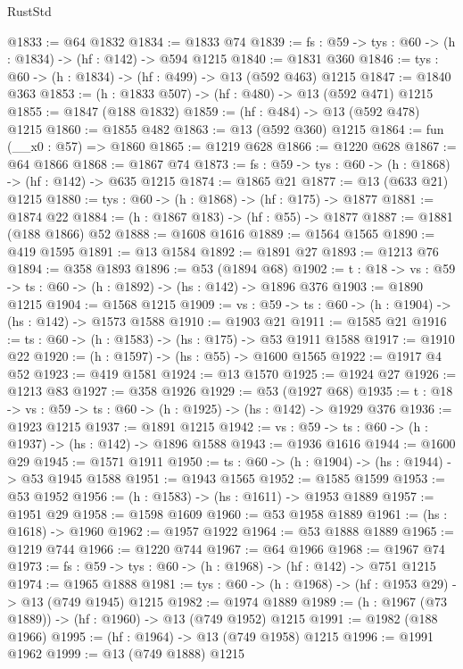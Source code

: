 \begin{lexlean}{RustStd}
\begin{coremodule}
{\begin{coremodule}
{{{{{{{{{{{{{{{{{{{{@1833 := @64 @1832
@1834 := @1833 @74
@1839 := {fs : @59} -> {tys : @60} -> (h : @1834) -> (hf : @142) -> @594 @1215
@1840 := @1831 @360
@1846 := {tys : @60} -> (h : @1834) -> (hf : @499) -> @13 (@592 @463) @1215
@1847 := @1840 @363
@1853 := (h : @1833 @507) -> (hf : @480) -> @13 (@592 @471) @1215
@1855 := @1847 (@188 @1832)
@1859 := (hf : @484) -> @13 (@592 @478) @1215
@1860 := @1855 @482
@1863 := @13 (@592 @360) @1215
@1864 := fun (__x0 : @57) => @1860
@1865 := @1219 @628
@1866 := @1220 @628
@1867 := @64 @1866
@1868 := @1867 @74
@1873 := {fs : @59} -> {tys : @60} -> (h : @1868) -> (hf : @142) -> @635 @1215
@1874 := @1865 @21
@1877 := @13 (@633 @21) @1215
@1880 := {tys : @60} -> (h : @1868) -> (hf : @175) -> @1877
@1881 := @1874 @22
@1884 := (h : @1867 @183) -> (hf : @55) -> @1877
@1887 := @1881 (@188 @1866) @52
@1888 := @1608 @1616
@1889 := @1564 @1565
@1890 := @419 @1595
@1891 := @13 @1584
@1892 := @1891 @27
@1893 := @1213 @76
@1894 := @358 @1893
@1896 := @53 (@1894 @68)
@1902 := {t : @18} -> {vs : @59} -> {ts : @60} -> (h : @1892) -> (hs : @142) -> @1896 @376
@1903 := @1890 @1215
@1904 := @1568 @1215
@1909 := {vs : @59} -> {ts : @60} -> (h : @1904) -> (hs : @142) -> @1573 @1588
@1910 := @1903 @21
@1911 := @1585 @21
@1916 := {ts : @60} -> (h : @1583) -> (hs : @175) -> @53 @1911 @1588
@1917 := @1910 @22
@1920 := (h : @1597) -> (hs : @55) -> @1600 @1565
@1922 := @1917 @4 @52
@1923 := @419 @1581
@1924 := @13 @1570
@1925 := @1924 @27
@1926 := @1213 @83
@1927 := @358 @1926
@1929 := @53 (@1927 @68)
@1935 := {t : @18} -> {vs : @59} -> {ts : @60} -> (h : @1925) -> (hs : @142) -> @1929 @376
@1936 := @1923 @1215
@1937 := @1891 @1215
@1942 := {vs : @59} -> {ts : @60} -> (h : @1937) -> (hs : @142) -> @1896 @1588
@1943 := @1936 @1616
@1944 := @1600 @29
@1945 := @1571 @1911
@1950 := {ts : @60} -> (h : @1904) -> (hs : @1944) -> @53 @1945 @1588
@1951 := @1943 @1565
@1952 := @1585 @1599
@1953 := @53 @1952
@1956 := (h : @1583) -> (hs : @1611) -> @1953 @1889
@1957 := @1951 @29
@1958 := @1598 @1609
@1960 := @53 @1958 @1889
@1961 := (hs : @1618) -> @1960
@1962 := @1957 @1922
@1964 := @53 @1888 @1889
@1965 := @1219 @744
@1966 := @1220 @744
@1967 := @64 @1966
@1968 := @1967 @74
@1973 := {fs : @59} -> {tys : @60} -> (h : @1968) -> (hf : @142) -> @751 @1215
@1974 := @1965 @1888
@1981 := {tys : @60} -> (h : @1968) -> (hf : @1953 @29) -> @13 (@749 @1945) @1215
@1982 := @1974 @1889
@1989 := (h : @1967 (@73 @1889)) -> (hf : @1960) -> @13 (@749 @1952) @1215
@1991 := @1982 (@188 @1966)
@1995 := (hf : @1964) -> @13 (@749 @1958) @1215
@1996 := @1991 @1962
@1999 := @13 (@749 @1888) @1215
}}}}}}}}}}}}}}}}}}}}
\end{coremodule}}
\end{coremodule}
\end{lexlean}
